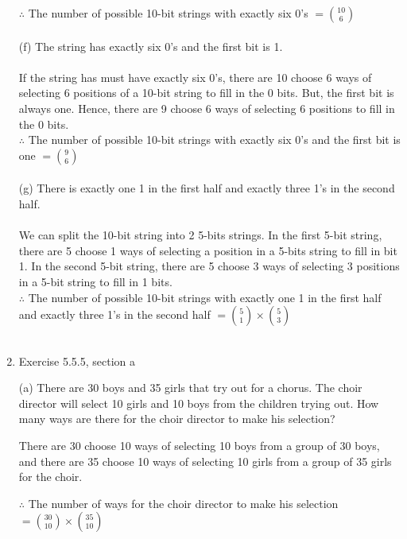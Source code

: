 \documentclass[14pt]{extreport}
\begin{document}
\begin{enumerate}[label=(\alph*)]
$\therefore$ The number of possible 10-bit strings with exactly six 0's $= \binom{10}{6}$ \\\\

(f) The string has exactly six 0's and the first bit is 1. \\\\
If the string has must have exactly six 0's, there are 10 choose 6 ways of selecting 6 positions of a 10-bit string to fill in the 0 bits. But, the first bit is always one. Hence, there are 9 choose 6 ways of selecting 6 positions to fill in the 0 bits. \\

$\therefore$ The number of possible 10-bit strings with exactly six 0's and the first bit is one $= \binom{9}{6}$ \\\\

(g) There is exactly one 1 in the first half and exactly three 1's in the second half. \\\\
We can split the 10-bit string into 2 5-bits strings. In the first 5-bit string, there are 5 choose 1 ways of selecting a position in a 5-bits string to fill in bit 1. In the second 5-bit string, there are 5 choose 3 ways of selecting 3 positions in a 5-bit string to fill in 1 bits.\\

$\therefore$ The number of possible 10-bit strings with exactly one 1 in the first half and exactly three 1's in the second half $= \binom{5}{1} \times \binom{5}{3}$ \\\\

\newpage
\item  Exercise	5.5.5,	section a
\newline

(a) There are 30 boys and 35 girls that try out for a chorus. The choir director will select 10 girls and 10 boys from the children trying out. How many ways are there for the choir director to make his selection?

There are 30 choose 10 ways of selecting 10 boys from a group of 30 boys, and there are 35 choose 10 ways of selecting 10 girls from a group of 35 girls for the choir. 

$\therefore$ The number of ways for the choir director to make his selection $= \binom{30}{10} \times \binom{35}{10}$ \\\\


\end{enumerate}
\end{document}
